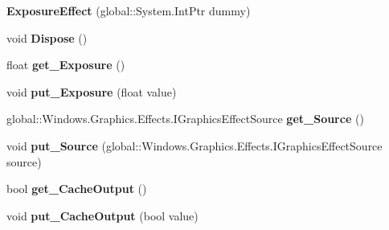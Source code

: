\begin{DoxyCompactItemize}
{\bfseries Exposure\+Effect} (global\+::\+System.\+Int\+Ptr dummy)
\item 
\mbox{\label{class_microsoft_1_1_graphics_1_1_canvas_1_1_effects_1_1_exposure_effect_a073502db74a16a0bc3b88fd3e0feee8a}} 
void {\bfseries Dispose} ()
\item 
\mbox{\label{class_microsoft_1_1_graphics_1_1_canvas_1_1_effects_1_1_exposure_effect_a21127a47d22be5f3657dce651488a984}} 
float {\bfseries get\+\_\+\+Exposure} ()
\item 
\mbox{\label{class_microsoft_1_1_graphics_1_1_canvas_1_1_effects_1_1_exposure_effect_ae2886e4afaf9fb5cc87189bfa0b30600}} 
void {\bfseries put\+\_\+\+Exposure} (float value)
\item 
\mbox{\label{class_microsoft_1_1_graphics_1_1_canvas_1_1_effects_1_1_exposure_effect_a3a4a21d04c4c1e3ab6ff7ab1a75397c8}} 
global\+::\+Windows.\+Graphics.\+Effects.\+I\+Graphics\+Effect\+Source {\bfseries get\+\_\+\+Source} ()
\item 
\mbox{\label{class_microsoft_1_1_graphics_1_1_canvas_1_1_effects_1_1_exposure_effect_ad8302b23b9b65d3b241aa0a15850c411}} 
void {\bfseries put\+\_\+\+Source} (global\+::\+Windows.\+Graphics.\+Effects.\+I\+Graphics\+Effect\+Source source)
\item 
\mbox{\label{class_microsoft_1_1_graphics_1_1_canvas_1_1_effects_1_1_exposure_effect_a6d781774b332d50000568372636dd32c}} 
bool {\bfseries get\+\_\+\+Cache\+Output} ()
\item 
\mbox{\label{class_microsoft_1_1_graphics_1_1_canvas_1_1_effects_1_1_exposure_effect_a173a563c6748ed7d1a15e042ffd9f8b1}} 
void {\bfseries put\+\_\+\+Cache\+Output} (bool value)
\item 
\mbox{\label{class_microsoft_1_1_graphics_1_1_canvas_1_1_effects_1_1_exposure_effect_a0268884188c61936111851732b91ddbb}} 

\end{DoxyCompactItemize}
